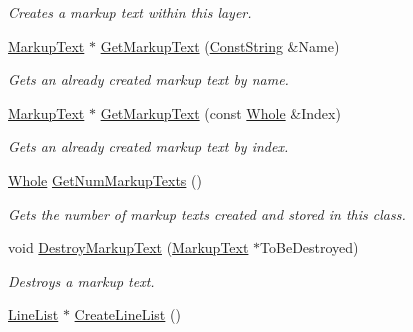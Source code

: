 \begin{DoxyCompactItemize}
\begin{DoxyCompactList}\small\item\em Creates a markup text within this layer. \item\end{DoxyCompactList}\item 
\hyperlink{classphys_1_1UI_1_1MarkupText}{MarkupText} $\ast$ \hyperlink{classphys_1_1UI_1_1Layer_aed2d7a1ad478f3d92005aeec4a777473}{GetMarkupText} (\hyperlink{namespacephys_a5ce5049f8b4bf88d6413c47b504ebb31}{ConstString} \&Name)
\begin{DoxyCompactList}\small\item\em Gets an already created markup text by name. \item\end{DoxyCompactList}\item 
\hyperlink{classphys_1_1UI_1_1MarkupText}{MarkupText} $\ast$ \hyperlink{classphys_1_1UI_1_1Layer_ae69320aefcfbc6f7f8c7364a04b2ae59}{GetMarkupText} (const \hyperlink{namespacephys_a460f6bc24c8dd347b05e0366ae34f34a}{Whole} \&Index)
\begin{DoxyCompactList}\small\item\em Gets an already created markup text by index. \item\end{DoxyCompactList}\item 
\hyperlink{namespacephys_a460f6bc24c8dd347b05e0366ae34f34a}{Whole} \hyperlink{classphys_1_1UI_1_1Layer_acc0fbbeabb701ad86826312b2ce88d60}{GetNumMarkupTexts} ()
\begin{DoxyCompactList}\small\item\em Gets the number of markup texts created and stored in this class. \item\end{DoxyCompactList}\item 
void \hyperlink{classphys_1_1UI_1_1Layer_a30a9991d13023b2bb941dab0667f91e6}{DestroyMarkupText} (\hyperlink{classphys_1_1UI_1_1MarkupText}{MarkupText} $\ast$ToBeDestroyed)
\begin{DoxyCompactList}\small\item\em Destroys a markup text. \item\end{DoxyCompactList}\item 
\hypertarget{classphys_1_1UI_1_1Layer_a16c50950bb79c8b06a046f2820329728}{
\hyperlink{classphys_1_1UI_1_1LineList}{LineList} $\ast$ \hyperlink{classphys_1_1UI_1_1Layer_a16c50950bb79c8b06a046f2820329728}{CreateLineList} ()}
\label{dd/d5b/classphys_1_1UI_1_1Layer_a16c50950bb79c8b06a046f2820329728}


\end{DoxyCompactItemize}
